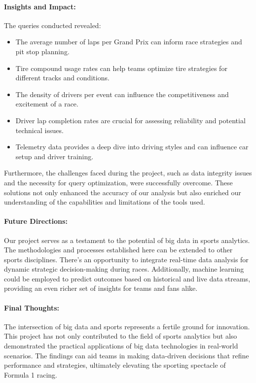 \documentclass{article}
\begin{document}
\paragraph{Insights and Impact:}
The queries conducted revealed:
\begin{itemize}
    \item The average number of laps per Grand Prix can inform race strategies and pit stop planning.
    \item Tire compound usage rates can help teams optimize tire strategies for different tracks and conditions.
    \item The density of drivers per event can influence the competitiveness and excitement of a race.
    \item Driver lap completion rates are crucial for assessing reliability and potential technical issues.
    \item Telemetry data provides a deep dive into driving styles and can influence car setup and driver training.
\end{itemize}

Furthermore, the challenges faced during the project, such as data integrity issues and the necessity for query optimization, were successfully overcome. These solutions not only enhanced the accuracy of our analysis but also enriched our understanding of the capabilities and limitations of the tools used.

\paragraph{Future Directions:}
Our project serves as a testament to the potential of big data in sports analytics. The methodologies and processes established here can be extended to other sports disciplines. There's an opportunity to integrate real-time data analysis for dynamic strategic decision-making during races. Additionally, machine learning could be employed to predict outcomes based on historical and live data streams, providing an even richer set of insights for teams and fans alike.

\paragraph{Final Thoughts:}
The intersection of big data and sports represents a fertile ground for innovation. This project has not only contributed to the field of sports analytics but also demonstrated the practical applications of big data technologies in real-world scenarios. The findings can aid teams in making data-driven decisions that refine performance and strategies, ultimately elevating the sporting spectacle of Formula 1 racing.
\end{document}
